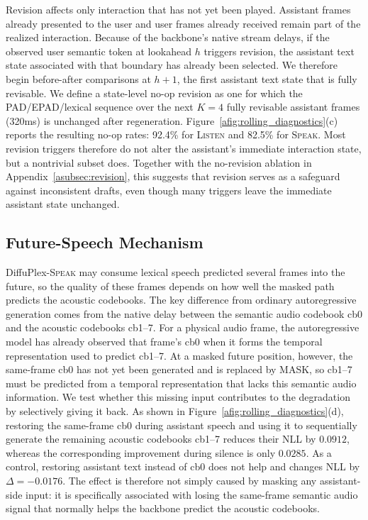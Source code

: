 Revision affects only interaction that has not yet been played.
Assistant frames already presented to the user and user frames already received remain part of the realized interaction.
Because of the backbone's native stream delays, if the observed user semantic token at lookahead $h$ triggers revision, the assistant text state associated with that boundary has already been selected.
We therefore begin before-after comparisons at $h+1$, the first assistant text state that is fully revisable.
We define a state-level no-op revision as one for which the PAD/EPAD/lexical sequence over the next $K=4$ fully revisable assistant frames (320ms) is unchanged after regeneration.
Figure~\ref{afig:rolling_diagnostics}(c) reports the resulting no-op rates: 92.4\% for \textsc{Listen} and 82.5\% for \textsc{Speak}.
Most revision triggers therefore do not alter the assistant's immediate interaction state, but a nontrivial subset does.
Together with the no-revision ablation in Appendix~\ref{asubsec:revision}, this suggests that revision serves as a safeguard against inconsistent drafts, even though many triggers leave the immediate assistant state unchanged.


\subsection{Future-Speech Mechanism}
\label{asubsec:future_speech}

DiffuPlex-\textsc{Speak} may consume lexical speech predicted several frames into the future, so the quality of these frames depends on how well the masked path predicts the acoustic codebooks.
The key difference from ordinary autoregressive generation comes from the native delay between the semantic audio codebook cb0 and the acoustic codebooks cb1--7.
For a physical audio frame, the autoregressive model has already observed that frame's cb0 when it forms the temporal representation used to predict cb1--7.
At a masked future position, however, the same-frame cb0 has not yet been generated and is replaced by MASK, so cb1--7 must be predicted from a temporal representation that lacks this semantic audio information.
We test whether this missing input contributes to the degradation by selectively giving it back.
As shown in Figure~\ref{afig:rolling_diagnostics}(d), restoring the same-frame cb0 during assistant speech and using it to sequentially generate the remaining acoustic codebooks cb1--7 reduces their NLL by $0.0912$, whereas the corresponding improvement during silence is only $0.0285$.
As a control, restoring assistant text instead of cb0 does not help and changes NLL by $\Delta=-0.0176$.
The effect is therefore not simply caused by masking any assistant-side input: it is specifically associated with losing the same-frame semantic audio signal that normally helps the backbone predict the acoustic codebooks.



